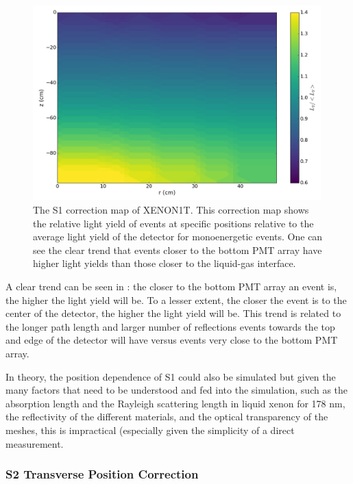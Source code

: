 \begin{figure}[t]
	\centering
	\includegraphics[width=0.99\textwidth]{xe1t_s1_correction_map}
	\caption{The S1 correction map of XENON1T.  This correction map shows the relative light yield of events at specific positions relative to the average light yield of the detector for monoenergetic events.  One can see the clear trend that events closer to the bottom PMT array have higher light yields than those closer to the liquid-gas interface.}
	\label{fig:xe1t_s1_correction_map}
\end{figure}


A clear trend can be seen in : the closer to the bottom PMT array an event is, the higher the light yield will be.  To a lesser extent, the closer the event is to the center of the detector, the higher the light yield will be.  This trend is related to the longer path length and larger number of reflections events towards the top and edge of the detector will have versus events very close to the bottom PMT array.

In theory, the position dependence of S1 could also be simulated but given the many factors that need to be understood and fed into the simulation, such as the absorption length and the Rayleigh scattering length in liquid xenon for 178 nm, the reflectivity of the different materials, and the optical transparency of the meshes, this is impractical (especially given the simplicity of a direct measurement.


\subsubsection{S2 Transverse Position Correction}

